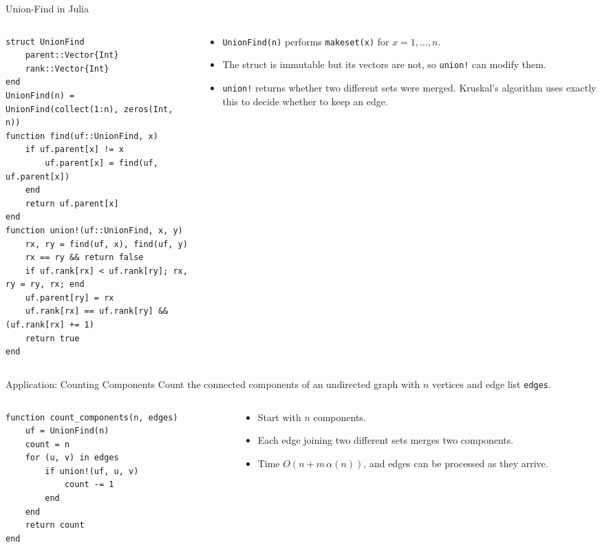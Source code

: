 \documentclass[10pt,aspectratio=169]{beamer}
\begin{document}
\begin{frame}[fragile]{Union-Find in Julia}
  \begin{columns}[c]
    \begin{column}{0.55\textwidth}
\begin{lstlisting}[basicstyle=\ttfamily\scriptsize]
struct UnionFind
    parent::Vector{Int}
    rank::Vector{Int}
end
UnionFind(n) = UnionFind(collect(1:n), zeros(Int, n))
function find(uf::UnionFind, x)
    if uf.parent[x] != x
        uf.parent[x] = find(uf, uf.parent[x])
    end
    return uf.parent[x]
end
function union!(uf::UnionFind, x, y)
    rx, ry = find(uf, x), find(uf, y)
    rx == ry && return false
    if uf.rank[rx] < uf.rank[ry]; rx, ry = ry, rx; end
    uf.parent[ry] = rx
    uf.rank[rx] == uf.rank[ry] && (uf.rank[rx] += 1)
    return true
end
\end{lstlisting}
    \end{column}
    \begin{column}{0.4\textwidth}
      \begin{itemize}
        \item \texttt{UnionFind(n)} performs \texttt{makeset(x)} for
              $x = 1, \ldots, n$.
        \item The struct is immutable but its vectors are not, so
              \texttt{union!} can modify them.
        \item \texttt{union!} returns whether two different sets were
              merged. Kruskal's algorithm uses exactly this to decide
              whether to keep an edge.
      \end{itemize}
    \end{column}
  \end{columns}
\end{frame}

\begin{frame}[fragile]{Application: Counting Components}
  Count the connected components of an undirected graph with $n$ vertices and
  edge list \texttt{edges}.

  \begin{columns}[c]
    \begin{column}{0.5\textwidth}
\begin{lstlisting}
function count_components(n, edges)
    uf = UnionFind(n)
    count = n
    for (u, v) in edges
        if union!(uf, u, v)
            count -= 1
        end
    end
    return count
end
\end{lstlisting}
    \end{column}
    \begin{column}{0.45\textwidth}
      \begin{itemize}
        \item Start with $n$ components.
        \item Each edge joining two different sets merges two components.
        \item Time $O(n + m \, \alpha(n))$, and edges can be processed as
              they arrive.
      \end{itemize}
    \end{column}
  \end{columns}
\end{frame}
\end{document}
